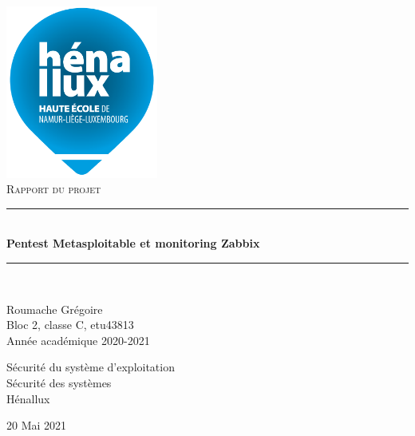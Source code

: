 \documentclass[a4paper]{article}
\newcommand{\HRule}{\rule{\linewidth}{0.5mm}}
\begin{document}
\begin{titlepage}
    \begin{sffamily}
        \begin{center}

            \includegraphics[width=5cm]{images/LogoHenallux.PNG}~\\[1.5cm]
            \textsc{\Large Rapport du projet}\\[1.5cm]

            \HRule \\[0.4cm]
            { \huge \bfseries Pentest Metasploitable et monitoring Zabbix\\[0.4cm] }
            \HRule \\[2cm]

            \begin{minipage}{0.4\textwidth}
                \begin{flushleft} \large
                    Roumache Grégoire\\
                    Bloc 2, classe C, etu43813 \\
                    Année académique 2020-2021\\
                \end{flushleft}
            \end{minipage}
            \begin{minipage}{0.55\textwidth}
                \begin{flushright} \large
                    Sécurité du système d'exploitation\\
                    Sécurité des systèmes\\
                    Hénallux\\
                \end{flushright}
            \end{minipage}
            \vfill

            {\large 20 Mai 2021}

        \end{center}
    \end{sffamily}
\end{titlepage}
\end{document}
